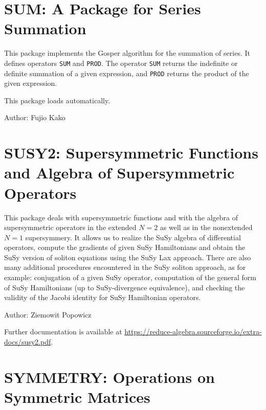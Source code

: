 \section{SUM: A Package for Series Summation}

This package implements the Gosper algorithm for the summation of series.
It defines operators {\tt SUM} and {\tt PROD}.  The operator {\tt SUM}
returns the indefinite or definite summation of a given expression, and
{\tt PROD} returns the product of the given expression.

This package loads automatically.

Author: Fujio Kako



\newpage

\section{SUSY2: Supersymmetric Functions and Algebra of Supersymmetric Operators}

This package deals with supersymmetric functions and with the algebra
of supersymmetric operators in the extended $N=2$ as well as in the
nonextended $N=1$ supersymmery.  It allows us to realize the SuSy
algebra of differential operators, compute the gradients of given SuSy
Hamiltonians and obtain the SuSy version of soliton equations using
the SuSy Lax approach.  There are also many additional procedures
encountered in the SuSy soliton approach, as for example: conjugation
of a given SuSy operator, computation of the general form of SuSy
Hamiltonians (up to SuSy-divergence equivalence), and checking the
validity of the Jacobi identity for SuSy Hamiltonian operators.

Author: Ziemowit Popowicz

\begin{sloppypar}
  Further documentation is available at
  \url{https://reduce-algebra.sourceforge.io/extra-docs/susy2.pdf}.
\end{sloppypar}

\newpage

\section{SYMMETRY: Operations on Symmetric Matrices}
\label{package:SYMMETRY}

